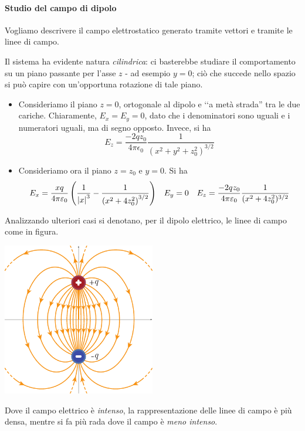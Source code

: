 \paragraph{Studio del campo di dipolo}
Vogliamo descrivere il campo elettrostatico generato tramite vettori e tramite le linee di campo.
\begin{observe}
	Il sistema ha evidente natura \textit{cilindrica}: ci basterebbe studiare il comportamento su un piano passante per l'asse $z$ - ad esempio $y=0$; ciò che succede nello spazio si può capire con un'opportuna rotazione di tale piano.
\end{observe}
\begin{itemize}
	\item Consideriamo il piano $z=0$, ortogonale al dipolo e ‘‘a metà strada'' tra le due cariche.
	Chiaramente, $E_x=E_y=0$, dato che i denominatori sono uguali e i numeratori uguali, ma di segno opposto. Invece, si ha
	\begin{equation*}
		E_z=\frac{-2qz_0}{4\pi\epsilon_0}\frac{1}{\left(x^2+y^2+z_0^2\right)^{3/2}}
	\end{equation*}
	\item Consideriamo ora il piano $z=z_0$ e $y=0$. Si ha
	\begin{align*}
		E_x=\frac{xq}{4\pi\varepsilon_0}\left(\frac{1}{\abs{x}^3}-\frac{1}{\left(x^2+4z_0^2\right)^{3/2}}\right)&&
		E_y=0&&
		E_z=\frac{-2qz_0}{4\pi\varepsilon_0}\frac{1}{(x^2+4z_0^2)^{3/2}}
	\end{align*}
\end{itemize}
Analizzando ulteriori casi si denotano, per il dipolo elettrico, le linee di campo come in figura.
\begin{center}
	\includegraphics[width=0.5\textwidth]{images/chp1campodipolo1.pdf}
\end{center}
\begin{observe}
	Dove il campo elettrico è \textit{intenso}, la rappresentazione delle linee di campo è più densa, mentre si fa più rada dove il campo è \textit{meno intenso}.
\end{observe}

